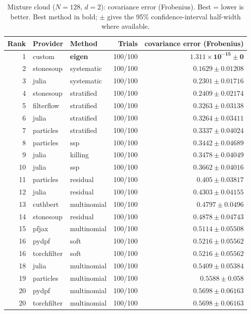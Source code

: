\begin{table}[!htbp]
\centering
\small
\caption{Mixture cloud ($N=128$, $d=2$): covariance error (Frobenius). Best = lower is better. Best method in bold; $\pm$ gives the 95\% confidence-interval half-width where available.}
\label{tab:mixture-cloud-covariance-error}
\begin{tabular}{rllrr}
\toprule
Rank & Provider & Method & Trials & covariance error (Frobenius) \\
\midrule
1 & custom & \textbf{eigen} & 100/100 & $\mathbf{1.311\times10^{-15} \pm 0}$ \\
2 & stonesoup & systematic & 100/100 & $0.1629 \pm 0.01208$ \\
3 & julia & systematic & 100/100 & $0.2301 \pm 0.01716$ \\
4 & stonesoup & stratified & 100/100 & $0.2409 \pm 0.02174$ \\
5 & filterflow & stratified & 100/100 & $0.3263 \pm 0.03138$ \\
6 & julia & stratified & 100/100 & $0.3264 \pm 0.03411$ \\
7 & particles & stratified & 100/100 & $0.3337 \pm 0.04024$ \\
8 & particles & ssp & 100/100 & $0.3442 \pm 0.04689$ \\
9 & julia & killing & 100/100 & $0.3478 \pm 0.04049$ \\
10 & julia & ssp & 100/100 & $0.3662 \pm 0.04016$ \\
11 & particles & residual & 100/100 & $0.405 \pm 0.03817$ \\
12 & julia & residual & 100/100 & $0.4303 \pm 0.04155$ \\
13 & cuthbert & multinomial & 100/100 & $0.4797 \pm 0.0496$ \\
14 & stonesoup & residual & 100/100 & $0.4878 \pm 0.04743$ \\
15 & pfjax & multinomial & 100/100 & $0.5114 \pm 0.05508$ \\
16 & pydpf & soft & 100/100 & $0.5216 \pm 0.05562$ \\
16 & torchfilter & soft & 100/100 & $0.5216 \pm 0.05562$ \\
18 & julia & multinomial & 100/100 & $0.5409 \pm 0.05384$ \\
19 & particles & multinomial & 100/100 & $0.5588 \pm 0.058$ \\
20 & pydpf & multinomial & 100/100 & $0.5698 \pm 0.06163$ \\
20 & torchfilter & multinomial & 100/100 & $0.5698 \pm 0.06163$ \\

\end{tabular}
\end{table}
